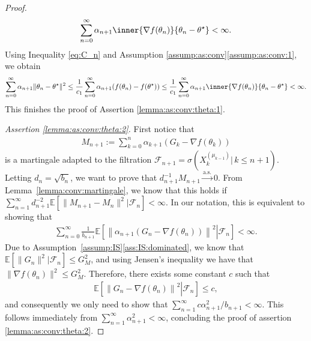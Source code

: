 \documentclass[11pt,a4paper]{article}
\theoremstyle{definition}
\begin{document}
\begin{proof}
\begin{align}
\label{eq:C_n}
    \sum_{n=0}^\infty \alpha_{n+1}\inner{\nabla f(\theta_n)}{\theta_n - \theta^\star} < \infty.
\end{align}
Using Inequality \eqref{eq:C_n} and Assumption \ref{assump:as:conv}\ref{assump:as:conv:1}, we obtain
\begin{align*}
    \sum_{n=0}^\infty \alpha_{n+1}\|\theta_n - \theta^\star\|^2 \leq \frac{1}{c_1}\sum_{n=0}^\infty \alpha_{n+1} ({f}(\theta_n) - {f}(\theta^\star)) \leq  \frac{1}{c_1} \sum_{n=0}^\infty \alpha_{n+1}\inner{\nabla {f}(\theta_n)}{\theta_n - \theta^\star} < \infty.
\end{align*}
This finishes the proof of Assertion \ref{lemma:as:conv:theta:1}.

\medskip

\emph{Assertion \ref{lemma:as:conv:theta:2}.} First notice that 
\begin{align*}
    M_{n+1} := \sum_{k=0}^{n} \alpha_{k+1}(G_k - \nabla f(\theta_k) )
\end{align*}
is a martingale adapted to the filtration $\mathcal F_{n+1} = \sigma(X_k^{(\mu_{k-1})} |\, k \leq n+1)$. Letting $d_{n} = \sqrt{b_{n}}$, we want to prove that $d_{n+1}^{-1} M_{n+1}  \overset{\text{a.s.}}{\to} 0$. From Lemma~\ref{lemma:conv:martingale}, we know that this holds if $\sum_{n=1}^\infty d_{n+1}^{-2} \mathbb E[\|M_{n+1}-M_{n}\|^2 | \mathcal F_{n}] < \infty$. In our notation, this is equivalent to showing that
\begin{align*}
    \sum_{n=0}^\infty \frac{1}{b_{n+1}} \mathbb E \left.\left[\left\|\alpha_{n+1} (G_n - \nabla f(\theta_n) ) \right\|^2 \right| \mathcal F_{n}  \right] < \infty.
\end{align*}
Due to Assumption~\ref{assump:IS}\ref{ass:IS:dominated}, we know that $\mathbb E[\|G_n\|^2 | \mathcal F_n] \leq G_M^2$, and using Jensen's inequality we have that $\|\nabla f(\theta_n)\|^2 \leq G_M^2$. Therefore, there exists some constant $c$ such that 
\begin{align*}
    \mathbb E \left.\left[\left\| G_n - \nabla f(\theta_n)\right\|^2 \right| \mathcal F_{n}  \right] \leq c,
\end{align*}
and consequently we only need to show that $\sum_{n=1}^\infty c {\alpha_{n+1}^2}/{b_{n+1}} < \infty$. This follows immediately from $\sum_{n=1}^\infty {\alpha_{n+1}^2} < \infty$, concluding the proof of assertion \ref{lemma:as:conv:theta:2}.

\medskip


\end{proof}
\end{document}

